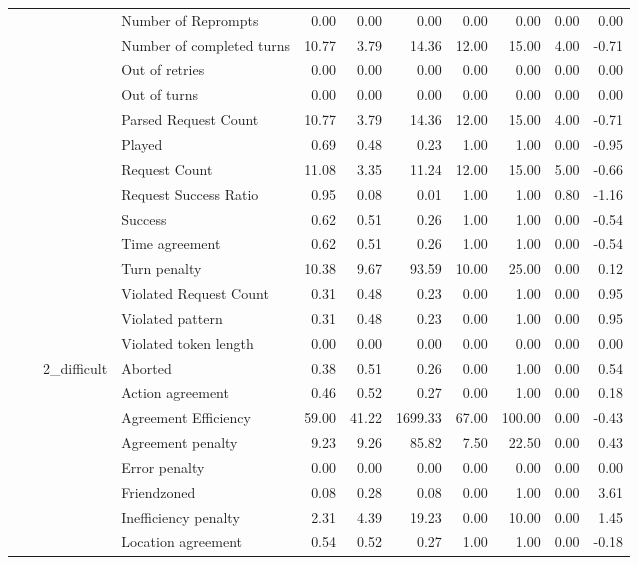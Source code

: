 \begin{tabular}{llllrrrrrrr}
 &  &  & Number of Reprompts & 0.00 & 0.00 & 0.00 & 0.00 & 0.00 & 0.00 & 0.00 \\
 &  &  & Number of completed turns & 10.77 & 3.79 & 14.36 & 12.00 & 15.00 & 4.00 & -0.71 \\
 &  &  & Out of retries & 0.00 & 0.00 & 0.00 & 0.00 & 0.00 & 0.00 & 0.00 \\
 &  &  & Out of turns & 0.00 & 0.00 & 0.00 & 0.00 & 0.00 & 0.00 & 0.00 \\
 &  &  & Parsed Request Count & 10.77 & 3.79 & 14.36 & 12.00 & 15.00 & 4.00 & -0.71 \\
 &  &  & Played & 0.69 & 0.48 & 0.23 & 1.00 & 1.00 & 0.00 & -0.95 \\
 &  &  & Request Count & 11.08 & 3.35 & 11.24 & 12.00 & 15.00 & 5.00 & -0.66 \\
 &  &  & Request Success Ratio & 0.95 & 0.08 & 0.01 & 1.00 & 1.00 & 0.80 & -1.16 \\
 &  &  & Success & 0.62 & 0.51 & 0.26 & 1.00 & 1.00 & 0.00 & -0.54 \\
 &  &  & Time agreement & 0.62 & 0.51 & 0.26 & 1.00 & 1.00 & 0.00 & -0.54 \\
 &  &  & Turn penalty & 10.38 & 9.67 & 93.59 & 10.00 & 25.00 & 0.00 & 0.12 \\
 &  &  & Violated Request Count & 0.31 & 0.48 & 0.23 & 0.00 & 1.00 & 0.00 & 0.95 \\
 &  &  & Violated pattern & 0.31 & 0.48 & 0.23 & 0.00 & 1.00 & 0.00 & 0.95 \\
 &  &  & Violated token length & 0.00 & 0.00 & 0.00 & 0.00 & 0.00 & 0.00 & 0.00 \\
\cline{3-11}
 &  & \multirow[t]{27}{*}{2_difficult} & Aborted & 0.38 & 0.51 & 0.26 & 0.00 & 1.00 & 0.00 & 0.54 \\
 &  &  & Action agreement & 0.46 & 0.52 & 0.27 & 0.00 & 1.00 & 0.00 & 0.18 \\
 &  &  & Agreement Efficiency & 59.00 & 41.22 & 1699.33 & 67.00 & 100.00 & 0.00 & -0.43 \\
 &  &  & Agreement penalty & 9.23 & 9.26 & 85.82 & 7.50 & 22.50 & 0.00 & 0.43 \\
 &  &  & Error penalty & 0.00 & 0.00 & 0.00 & 0.00 & 0.00 & 0.00 & 0.00 \\
 &  &  & Friendzoned & 0.08 & 0.28 & 0.08 & 0.00 & 1.00 & 0.00 & 3.61 \\
 &  &  & Inefficiency penalty & 2.31 & 4.39 & 19.23 & 0.00 & 10.00 & 0.00 & 1.45 \\
 &  &  & Location agreement & 0.54 & 0.52 & 0.27 & 1.00 & 1.00 & 0.00 & -0.18 \\

\end{tabular}
